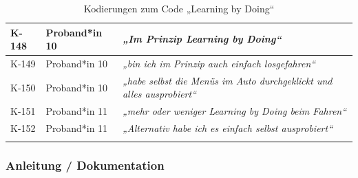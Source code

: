 {\begin{xltabular}{\textwidth}{
    |P{0.10\textwidth}
    |P{0.17\textwidth}
    |Y|
}
\hline
K-148 & Proband*in 10 & \textit{„Im Prinzip Learning by Doing“} \\
\hline
K-149 & Proband*in 10 & \textit{„bin ich im Prinzip auch einfach losgefahren“} \\
\hline
K-150 & Proband*in 10 & \textit{„habe selbst die Menüs im Auto durchgeklickt und alles ausprobiert“} \\
\hline
K-151 & Proband*in 11 & \textit{„mehr oder weniger Learning by Doing beim Fahren“} \\
\hline
K-152 & Proband*in 11 & \textit{„Alternativ habe ich es einfach selbst ausprobiert“} \\
\hline
\caption{Kodierungen zum Code „Learning by Doing“}\label{tab:kodiernachweis-learning-by-doing}\\
\end{xltabular}
}

\clearpage
\subsubsection{Anleitung / Dokumentation}

